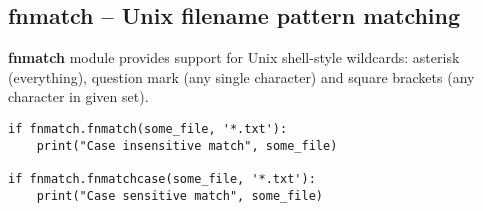 %

\subsection{fnmatch -- Unix filename pattern matching}
\label{subsection_fnmatch}%
\textbf{fnmatch} module provides support for Unix shell-style wildcards: asterisk (everything), question mark (any single character) and square brackets (any character in given set).

\begin{verbatim}
if fnmatch.fnmatch(some_file, '*.txt'):
    print("Case insensitive match", some_file)

if fnmatch.fnmatchcase(some_file, '*.txt'):
    print("Case sensitive match", some_file)
\end{verbatim}

%